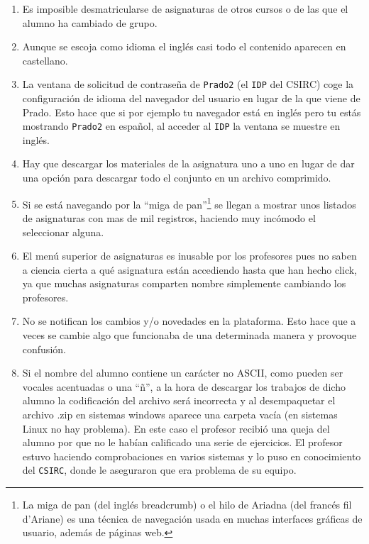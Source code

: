 \begin{enumerate}

\item Es imposible desmatricularse de asignaturas de otros cursos o de las que el alumno ha cambiado de grupo.

\item Aunque se escoja como idioma el inglés casi todo el contenido aparecen en castellano.

\item La ventana de solicitud de contraseña de \texttt{Prado2} (el \texttt{IDP} del CSIRC) coge la configuración de idioma del navegador del usuario en lugar de la que viene de Prado. Esto hace que si por ejemplo tu navegador está en inglés pero tu estás mostrando \texttt{Prado2} en español, al acceder al \texttt{IDP} la ventana se muestre en inglés.

\item Hay que descargar los materiales de la asignatura uno a uno en lugar de dar una opción para descargar todo el conjunto en un archivo comprimido.

\item Si se está navegando por la ``miga de pan''\footnote{La miga de pan (del inglés breadcrumb) o el hilo de Ariadna (del francés fil d'Ariane) es una técnica de navegación usada en muchas interfaces gráficas de usuario, además de páginas web.} se llegan a mostrar unos listados de asignaturas con mas de mil registros, haciendo muy incómodo el seleccionar alguna.

\item El menú superior de asignaturas es inusable por los profesores pues no saben a ciencia cierta a qué asignatura están accediendo hasta que han hecho click, ya que muchas asignaturas comparten nombre simplemente cambiando los profesores.

\item No se notifican los cambios y/o novedades en la plataforma. Esto hace que a veces se cambie algo que funcionaba de una determinada manera y provoque confusión.

\item Si el nombre del alumno contiene un carácter no ASCII, como pueden ser vocales acentuadas o una ``ñ'', a la hora de descargar los trabajos de dicho alumno la codificación del archivo será incorrecta y al desempaquetar el archivo .zip en sistemas windows aparece una carpeta vacía (en sistemas Linux no hay problema). En este caso el profesor recibió una queja del alumno por que no le habían calificado una serie de ejercicios. El profesor estuvo haciendo comprobaciones en varios sistemas y lo puso en conocimiento del \texttt{CSIRC}, donde le aseguraron que era problema de su equipo.


\end{enumerate}
